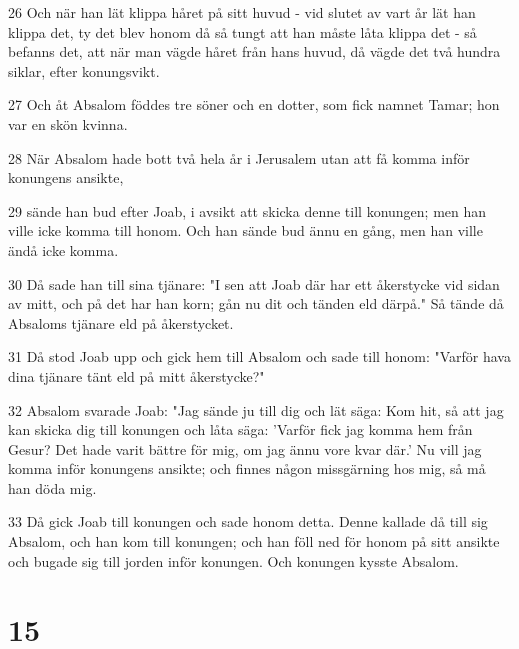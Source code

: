 \par 26 Och när han lät klippa håret på sitt huvud - vid slutet av vart år lät han klippa det, ty det blev honom då så tungt att han måste låta klippa det - så befanns det, att när man vägde håret från hans huvud, då vägde det två hundra siklar, efter konungsvikt.
\par 27 Och åt Absalom föddes tre söner och en dotter, som fick namnet Tamar; hon var en skön kvinna.
\par 28 När Absalom hade bott två hela år i Jerusalem utan att få komma inför konungens ansikte,
\par 29 sände han bud efter Joab, i avsikt att skicka denne till konungen; men han ville icke komma till honom. Och han sände bud ännu en gång, men han ville ändå icke komma.
\par 30 Då sade han till sina tjänare: "I sen att Joab där har ett åkerstycke vid sidan av mitt, och på det har han korn; gån nu dit och tänden eld därpå." Så tände då Absaloms tjänare eld på åkerstycket.
\par 31 Då stod Joab upp och gick hem till Absalom och sade till honom: "Varför hava dina tjänare tänt eld på mitt åkerstycke?"
\par 32 Absalom svarade Joab: "Jag sände ju till dig och lät säga: Kom hit, så att jag kan skicka dig till konungen och låta säga: 'Varför fick jag komma hem från Gesur? Det hade varit bättre för mig, om jag ännu vore kvar där.' Nu vill jag komma inför konungens ansikte; och finnes någon missgärning hos mig, så må han döda mig.
\par 33 Då gick Joab till konungen och sade honom detta. Denne kallade då till sig Absalom, och han kom till konungen; och han föll ned för honom på sitt ansikte och bugade sig till jorden inför konungen. Och konungen kysste Absalom.

\chapter{15}

